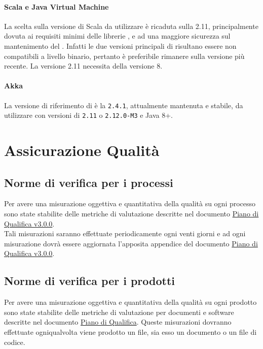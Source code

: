 \documentclass{scalatekids-article}
\begin{document}
\paragraph{Scala e Java Virtual Machine}

La scelta sulla versione di Scala da utilizzare è ricaduta sulla 
2.11, principalmente dovuta ai requisiti minimi delle librerie \textit{}, e
ad una maggiore sicurezza sul mantenimento del . Infatti le due versioni
principali di  risultano essere non compatibili a livello binario,
pertanto è preferibile rimanere sulla versione più recente. La versione 2.11
necessita della  versione 8.

\paragraph{Akka}

La versione di riferimento di  è la \verb=2.4.1=, attualmente
mantenuta e stabile, da utilizzare con versioni di  \verb=2.11= o
\verb=2.12.0-M3= e Java 8+.

\section{Assicurazione Qualità}

\subsection{Norme di verifica per i processi}

Per avere una misurazione oggettiva e quantitativa della qualità su ogni processo sono state stabilite delle metriche di valutazione descritte nel documento \href{run:../Esterni/PianoDiQualifica\_v3.0.0.pdf}{Piano di Qualifica v3.0.0}.\\Tali misurazioni saranno effettuate periodicamente ogni venti giorni e ad ogni misurazione dovrà essere aggiornata l'apposita appendice del documento \href{run:../Esterni/PianoDiQualifica\_v3.0.0.pdf}{Piano di Qualifica v3.0.0}.

\subsection{Norme di verifica per i prodotti}

Per avere una misurazione oggettiva e quantitativa della qualità su ogni prodotto sono state stabilite delle metriche di valutazione per documenti e software descritte nel documento \href{run:../Esterni/PianoDiQualifica\_v3.0.0.pdf}{Piano di Qualifica}. Queste misurazioni dovranno effettuate ogniqualvolta viene prodotto un file, sia esso un documento o un file di codice.\\
\end{document}
